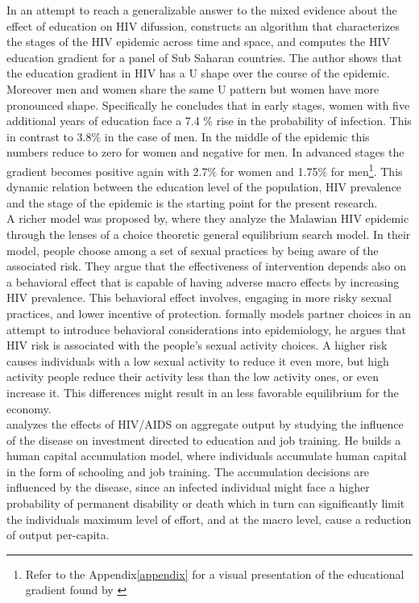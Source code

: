 In an attempt to reach a generalizable answer to the mixed evidence about the effect of education on HIV difussion,\cite{raul} constructs an algorithm that characterizes the stages of the HIV epidemic across time and space, and computes the HIV education gradient for a panel of Sub Saharan countries. The author shows that the education gradient in HIV has a U shape over the course of the epidemic. Moreover men and women share the same U pattern but women have more pronounced shape. Specifically he concludes that in early stages, women with five additional years of education face a 7.4 $\%$ rise in the probability of infection. This in contrast to 3.8$\%$ in the case of men. In the middle of the epidemic this numbers reduce to zero for women and negative for men. In advanced stages the gradient becomes positive again with 2.7$\%$ for women and 1.75$\%$ for men\footnote{Refer to the Appendix\ref{appendix} for a visual presentation of the educational gradient found by \cite{raul}}. This dynamic relation between the education level of the population, HIV prevalence and the stage of the epidemic is the starting point for the present research.\\

A richer model was proposed by\cite{michelle}, where they analyze the Malawian HIV epidemic through the lenses of a choice theoretic general equilibrium search model. In their model, people choose among a set of sexual practices by being aware of the associated risk. They argue that the effectiveness of intervention depends also on a behavioral effect that is capable of having adverse macro effects by increasing HIV prevalence. This behavioral effect involves, engaging in more risky sexual practices, and lower incentive of protection. \cite{kremer}formally models partner choices in  an attempt to introduce behavioral considerations into epidemiology, he argues that HIV risk is associated with the people's sexual activity choices. A higher risk causes individuals with a low sexual activity to reduce it even more, but high activity people reduce their activity less than the low activity ones, or even increase it. This differences might result in an less favorable equilibrium for the economy.\\

\cite{manuelli} analyzes the effects of HIV/AIDS on aggregate output by studying the influence of the disease on investment directed to education and job training. He builds a human capital accumulation model, where individuals accumulate human capital in the form of schooling and job training. The accumulation decisions are influenced by the disease, since an infected individual might face a higher probability of permanent disability or death which in turn can significantly limit the individuals maximum level of effort, and at the macro level, cause a reduction of output per-capita.\\

